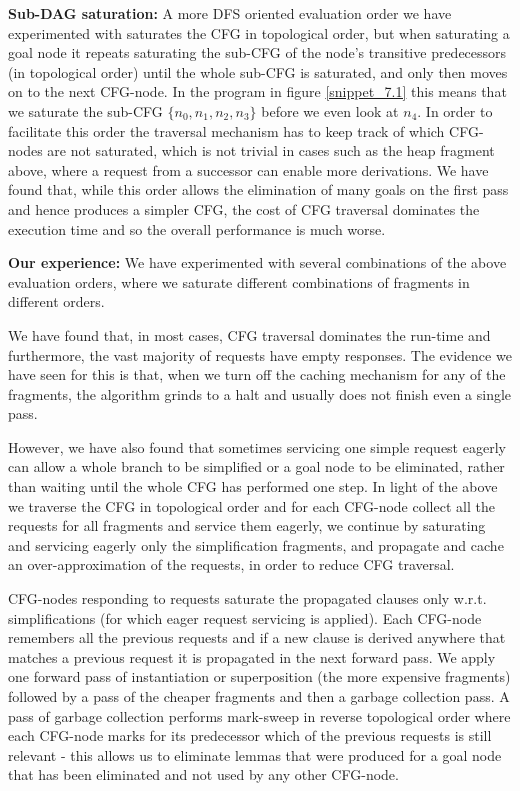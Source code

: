 \textbf{Sub-DAG saturation:}
A more DFS  oriented evaluation order we have experimented with saturates the CFG in topological order, but when saturating a goal node it repeats saturating the sub-CFG of the node's transitive predecessors (in topological order) until the whole sub-CFG is saturated, and only then moves on to the next CFG-node. 
In the program in figure \ref{snippet_7.1} this means that we saturate the sub-CFG $\{n_0,n_1,n_2,n_3\}$ before we even look at $n_4$.
In order to facilitate this order the traversal mechanism has to keep track of which CFG-nodes are not saturated, which is not trivial in cases such as the heap fragment above, where a request from a successor can enable more derivations.
We have found that, while this order allows the elimination of many goals on the first pass and hence produces a simpler CFG, the cost of CFG traversal dominates the execution time and so the overall performance is much worse.

\textbf{Our experience:}
We have experimented with several combinations of the above evaluation orders, where we saturate different combinations of fragments in different orders.

We have found that, in most cases, CFG traversal dominates the run-time and furthermore, the vast majority of requests have empty responses. The evidence we have seen for this is that, when we turn off the caching mechanism for any of the fragments, the algorithm grinds to a halt and usually does not finish even a single pass.

However, we have also found that sometimes servicing one simple request eagerly can allow a whole branch to be simplified or a goal node to be eliminated, rather than waiting until the whole CFG has performed one step. 
In light of the above we traverse the CFG in topological order and for each CFG-node collect all the requests for all fragments and service them eagerly, we continue by saturating and servicing eagerly only the simplification fragments, and propagate and cache an over-approximation of the requests, in order to reduce CFG traversal.

CFG-nodes responding to requests saturate the propagated clauses only w.r.t. simplifications (for which eager request servicing is applied). Each CFG-node remembers all the previous requests and if a new clause is derived anywhere that matches a previous request it is propagated in the next forward pass.
We apply one forward pass of instantiation or superposition (the more expensive fragments) followed by a pass of the cheaper fragments and then a garbage collection pass. 
A pass of garbage collection performs mark-sweep in reverse topological order where each CFG-node marks for its predecessor which of the previous requests is still relevant - this allows us to eliminate lemmas that were produced for a goal node that has been eliminated and not used by any other CFG-node.

